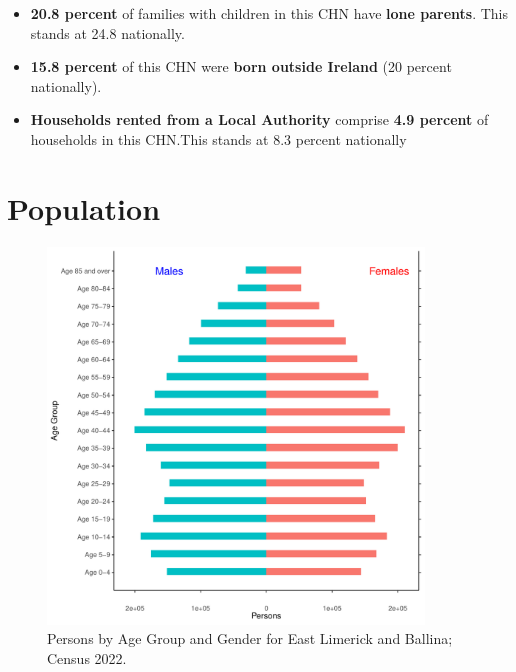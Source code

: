 \documentclass{article}
\begin{document}
\begin{itemize}
\item \textbf{20.8 percent} of families with children in this CHN have \textbf{lone parents}. This stands at 24.8 nationally.

\item \textbf{15.8 percent} of this CHN were \textbf{born outside Ireland} (20 percent nationally).

\item \textbf{Households rented from a Local Authority} comprise \textbf{4.9 percent} of households in this CHN.This stands at 8.3 percent nationally

\end{itemize}

\pagebreak

\section{Population} 
\label{sect:Pop}

\begin{figure}[h]
	\centering
	\includegraphics[width = 100mm]{../figures/PyramidPlot.pdf}
	\caption{Persons by Age Group and Gender for East Limerick and Ballina; Census 2022.}
	\label{fig:2ae19629-1a6a-13a3-e055-000000000001}
	\end{figure}
\end{document}
